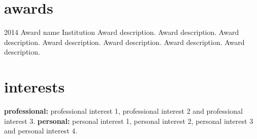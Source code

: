 \documentclass[]{friggeri-cv}
\begin{document}




\section{awards}

\begin{entrylist}
\entry
{2014}
{Award name}
{Institution}
{Award description. Award description. Award description. Award description. Award description. Award description. Award description. }
\end{entrylist}


\section{interests}
  \vspace{-0.2cm}

\textbf{professional:} professional interest 1, professional interest 2 and professional interest 3. \textbf{personal:} personal interest 1, personal interest 2, personal interest 3 and personal interest 4.

\end{document}

